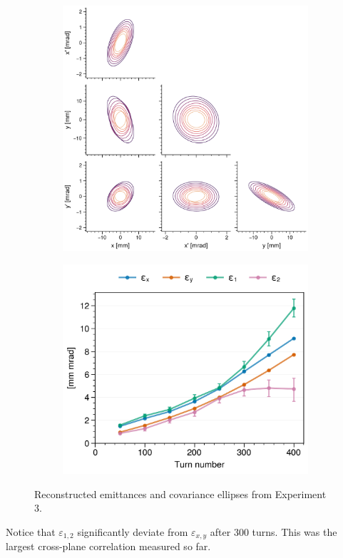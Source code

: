 \begin{figure}[!p]
    \centering
    \begin{subfigure}{0.6\textwidth}
        \includegraphics[width=\textwidth]{Images/chapter5/exp3/corner.png}
    \end{subfigure}
    \hfill
    \begin{subfigure}[t]{0.39\textwidth}
        \includegraphics[width=\textwidth]{Images/chapter5/exp3/emittances.png}
    \end{subfigure}
    \caption{Reconstructed emittances and covariance ellipses from Experiment 3.}
    \label{fig:exp3_emittances}
\end{figure}
% 
Notice that $\varepsilon_{1,2}$ significantly deviate from $\varepsilon_{x,y}$ after 300 turns. This was the largest cross-plane correlation measured so far. 

